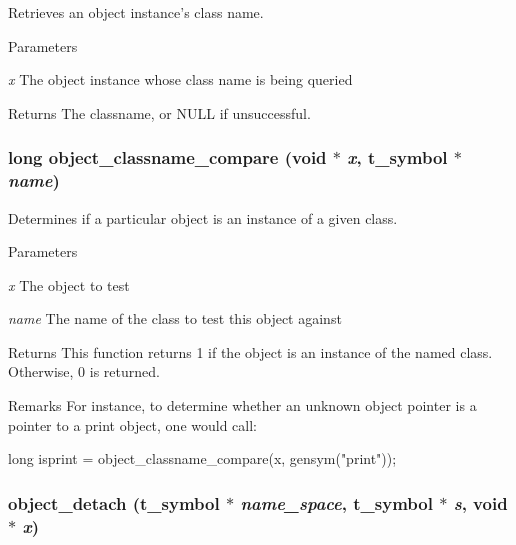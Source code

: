 Retrieves an object instance's class name. 
\begin{DoxyParams}{Parameters}
\item[{\em x}]The object instance whose class name is being queried \end{DoxyParams}
\begin{DoxyReturn}{Returns}
The classname, or NULL if unsuccessful. 
\end{DoxyReturn}
\hypertarget{group__obj_ga020d01fb1a55690dc760450bac6a624a}{
\subsubsection[{object\_\-classname\_\-compare}]{\setlength{\rightskip}{0pt plus 5cm}long object\_\-classname\_\-compare (void $\ast$ {\em x}, \/  {\bf t\_\-symbol} $\ast$ {\em name})}}
\label{group__obj_ga020d01fb1a55690dc760450bac6a624a}


Determines if a particular object is an instance of a given class. 
\begin{DoxyParams}{Parameters}
\item[{\em x}]The object to test \item[{\em name}]The name of the class to test this object against \end{DoxyParams}
\begin{DoxyReturn}{Returns}
This function returns 1 if the object is an instance of the named class. Otherwise, 0 is returned. 
\end{DoxyReturn}
\begin{DoxyRemark}{Remarks}
For instance, to determine whether an unknown object pointer is a pointer to a print object, one would call:
\end{DoxyRemark}

\begin{DoxyCode}
    long isprint = object_classname_compare(x, gensym("print"));
\end{DoxyCode}
 \hypertarget{group__obj_ga6765e9533a3ae0d67d302f1e038c66ac}{
\subsubsection[{object\_\-detach}]{ object\_\-detach ({\bf t\_\-symbol} $\ast$ {\em name\_\-space}, \/  {\bf t\_\-symbol} $\ast$ {\em s}, \/  void $\ast$ {\em x})}}
\label{group__obj_ga6765e9533a3ae0d67d302f1e038c66ac}


